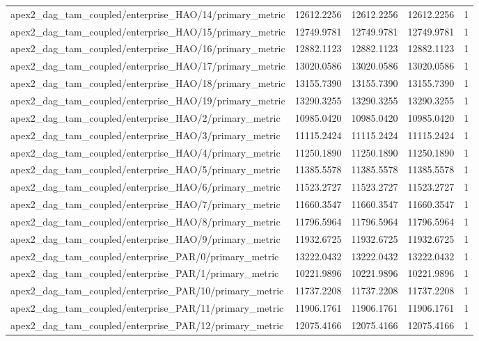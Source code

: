\begin{table}[h]
\begin{tabular}{lrrrr}
apex2_dag_tam_coupled/enterprise_HAO/14/primary_metric & 12612.2256 & 12612.2256 & 12612.2256 & 1 \\
apex2_dag_tam_coupled/enterprise_HAO/15/primary_metric & 12749.9781 & 12749.9781 & 12749.9781 & 1 \\
apex2_dag_tam_coupled/enterprise_HAO/16/primary_metric & 12882.1123 & 12882.1123 & 12882.1123 & 1 \\
apex2_dag_tam_coupled/enterprise_HAO/17/primary_metric & 13020.0586 & 13020.0586 & 13020.0586 & 1 \\
apex2_dag_tam_coupled/enterprise_HAO/18/primary_metric & 13155.7390 & 13155.7390 & 13155.7390 & 1 \\
apex2_dag_tam_coupled/enterprise_HAO/19/primary_metric & 13290.3255 & 13290.3255 & 13290.3255 & 1 \\
apex2_dag_tam_coupled/enterprise_HAO/2/primary_metric & 10985.0420 & 10985.0420 & 10985.0420 & 1 \\
apex2_dag_tam_coupled/enterprise_HAO/3/primary_metric & 11115.2424 & 11115.2424 & 11115.2424 & 1 \\
apex2_dag_tam_coupled/enterprise_HAO/4/primary_metric & 11250.1890 & 11250.1890 & 11250.1890 & 1 \\
apex2_dag_tam_coupled/enterprise_HAO/5/primary_metric & 11385.5578 & 11385.5578 & 11385.5578 & 1 \\
apex2_dag_tam_coupled/enterprise_HAO/6/primary_metric & 11523.2727 & 11523.2727 & 11523.2727 & 1 \\
apex2_dag_tam_coupled/enterprise_HAO/7/primary_metric & 11660.3547 & 11660.3547 & 11660.3547 & 1 \\
apex2_dag_tam_coupled/enterprise_HAO/8/primary_metric & 11796.5964 & 11796.5964 & 11796.5964 & 1 \\
apex2_dag_tam_coupled/enterprise_HAO/9/primary_metric & 11932.6725 & 11932.6725 & 11932.6725 & 1 \\
apex2_dag_tam_coupled/enterprise_PAR/0/primary_metric & 13222.0432 & 13222.0432 & 13222.0432 & 1 \\
apex2_dag_tam_coupled/enterprise_PAR/1/primary_metric & 10221.9896 & 10221.9896 & 10221.9896 & 1 \\
apex2_dag_tam_coupled/enterprise_PAR/10/primary_metric & 11737.2208 & 11737.2208 & 11737.2208 & 1 \\
apex2_dag_tam_coupled/enterprise_PAR/11/primary_metric & 11906.1761 & 11906.1761 & 11906.1761 & 1 \\
apex2_dag_tam_coupled/enterprise_PAR/12/primary_metric & 12075.4166 & 12075.4166 & 12075.4166 & 1 \\

\end{tabular}
\end{table}
